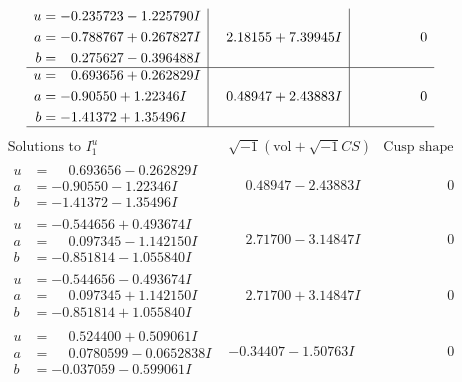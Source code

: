 \documentclass[1p]{elsarticle_modified}
\theoremstyle{definition}
\newcommand{\I}{\sqrt{-1}}
\begin{document}
$$\begin{array}{c|c|c}
\begin{aligned}
u &= -0.235723 - 1.225790 I \\
a &= -0.788767 + 0.267827 I \\
b &= \phantom{-}0.275627 - 0.396488 I\end{aligned}
 & \phantom{-}2.18155 + 7.39945 I & \phantom{-0.000000 } 0 \\ \hline\begin{aligned}
u &= \phantom{-}0.693656 + 0.262829 I \\
a &= -0.90550 + 1.22346 I \\
b &= -1.41372 + 1.35496 I\end{aligned}
 & \phantom{-}0.48947 + 2.43883 I & \phantom{-0.000000 } 0\\
 \hline 
 \end{array}$$\newpage$$\begin{array}{c|c|c}  
\text{Solutions to }I^u_{1}& \I (\text{vol} + \sqrt{-1}CS) & \text{Cusp shape}\\
 \hline 
\begin{aligned}
u &= \phantom{-}0.693656 - 0.262829 I \\
a &= -0.90550 - 1.22346 I \\
b &= -1.41372 - 1.35496 I\end{aligned}
 & \phantom{-}0.48947 - 2.43883 I & \phantom{-0.000000 } 0 \\ \hline\begin{aligned}
u &= -0.544656 + 0.493674 I \\
a &= \phantom{-}0.097345 - 1.142150 I \\
b &= -0.851814 - 1.055840 I\end{aligned}
 & \phantom{-}2.71700 - 3.14847 I & \phantom{-0.000000 } 0 \\ \hline\begin{aligned}
u &= -0.544656 - 0.493674 I \\
a &= \phantom{-}0.097345 + 1.142150 I \\
b &= -0.851814 + 1.055840 I\end{aligned}
 & \phantom{-}2.71700 + 3.14847 I & \phantom{-0.000000 } 0 \\ \hline\begin{aligned}
u &= \phantom{-}0.524400 + 0.509061 I \\
a &= \phantom{-}0.0780599 - 0.0652838 I \\
b &= -0.037059 - 0.599061 I\end{aligned}
 & -0.34407 - 1.50763 I & \phantom{-0.000000 } 0 \\ \hline\begin{aligned}

\end{aligned}
\end{array}$$
\end{document}
